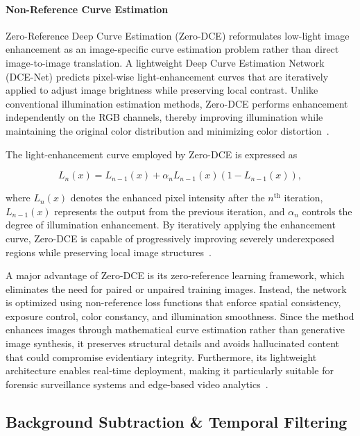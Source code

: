 \documentclass[conference]{IEEEtran}
\begin{document}
\paragraph{Non-Reference Curve Estimation} Zero-Reference Deep Curve Estimation (Zero-DCE) reformulates low-light image enhancement as an image-specific curve estimation problem rather than direct image-to-image translation. A lightweight Deep Curve Estimation Network (DCE-Net) predicts pixel-wise light-enhancement curves that are iteratively applied to adjust image brightness while preserving local contrast. Unlike conventional illumination estimation methods, Zero-DCE performs enhancement independently on the RGB channels, thereby improving illumination while maintaining the original color distribution and minimizing color distortion~\cite{zerodce}.

The light-enhancement curve employed by Zero-DCE is expressed as

\begin{equation}
L_{n}(x)=L_{n-1}(x)+\alpha_{n}L_{n-1}(x)\left(1-L_{n-1}(x)\right),
\label{eq:zerodce}
\end{equation}

where $L_n(x)$ denotes the enhanced pixel intensity after the $n^{\text{th}}$ iteration, $L_{n-1}(x)$ represents the output from the previous iteration, and $\alpha_n$ controls the degree of illumination enhancement. By iteratively applying the enhancement curve, Zero-DCE is capable of progressively improving severely underexposed regions while preserving local image structures~\cite{zerodce}.

A major advantage of Zero-DCE is its zero-reference learning framework, which eliminates the need for paired or unpaired training images. Instead, the network is optimized using non-reference loss functions that enforce spatial consistency, exposure control, color constancy, and illumination smoothness. Since the method enhances images through mathematical curve estimation rather than generative image synthesis, it preserves structural details and avoids hallucinated content that could compromise evidentiary integrity. Furthermore, its lightweight architecture enables real-time deployment, making it particularly suitable for forensic surveillance systems and edge-based video analytics~\cite{zerodce}.

\subsection{Background Subtraction \& Temporal Filtering}
\end{document}
